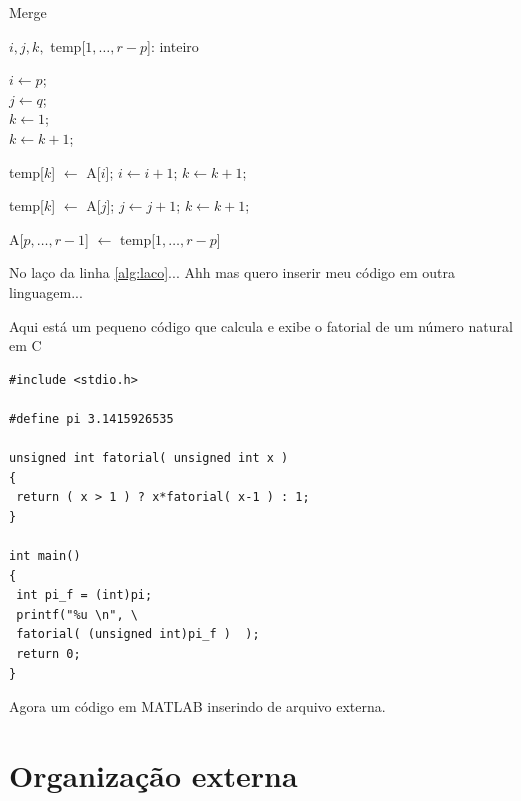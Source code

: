 \documentclass[10pt,a4paper,twocolumn]{book}
\begin{document}
		\begin{algorithm}[h]
			\caption{{\sc Merge }}
			\DontPrintSemicolon %
			$i, j, k,$ temp[$1, \ldots, r-p$]: inteiro 
			
			$i \gets p$;\\
			$j \gets q$;\\
			$k \gets 1$;\\
			
			{
				\label{alg:laco}
				$k \gets k + 1$;
			}
			
			{
				temp[$k$] $\gets$ A[$i$];\;
				$i \gets i + 1$;\;
				$k \gets k + 1$;
			}
			
			{
				temp[$k$] $\gets$ A[$j$];\; 
				$j \gets j + 1$;\;
				$k \gets k + 1$;
			}			
			
			A[$p , \ldots, r-1$] $\gets$ temp[$1, \ldots, r-p$]\;
			\;
			\label{algo:selectionsort}
		\end{algorithm}	
		
		No laço da linha \ref{alg:laco}...
		Ahh mas quero inserir meu código em outra linguagem...
		
\lstset{language=C}			
Aqui está um pequeno código que calcula e exibe o fatorial de um número natural em C

\begin{lstlisting}
#include <stdio.h>

#define pi 3.1415926535

unsigned int fatorial( unsigned int x )
{
 return ( x > 1 ) ? x*fatorial( x-1 ) : 1;
}

int main()
{
 int pi_f = (int)pi; 
 printf("%u \n", \
 fatorial( (unsigned int)pi_f )  );
 return 0;
}
\end{lstlisting}

Agora um código em MATLAB inserindo de arquivo externa.



\section{Organização externa}
	
	
\end{document}
